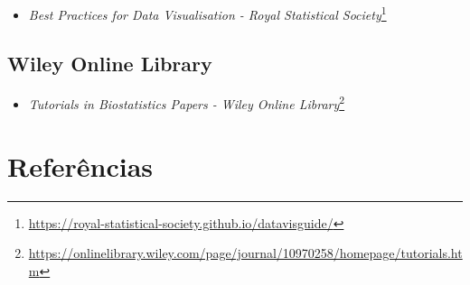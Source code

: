\documentclass[
  a4paper,
]{book}
\providecommand{\tightlist}{%
  \setlength{\itemsep}{0pt}\setlength{\parskip}{0pt}}
\renewcommand{\href}[2]{#2\footnote{\url{#1}}}
\newcommand{\DisableFootNotes}{%
  \renewcommand{\footnote}[2][]{\relax}
}
\begin{document}
\begin{itemize}
\tightlist
\item
  \href{https://royal-statistical-society.github.io/datavisguide/}{\emph{Best Practices for Data Visualisation - Royal Statistical Society}}
\end{itemize}

\hypertarget{wiley-online-library}{%
\section*{Wiley Online Library}\label{wiley-online-library}}

\begin{itemize}
\tightlist
\item
  \href{https://onlinelibrary.wiley.com/page/journal/10970258/homepage/tutorials.htm}{\emph{Tutorials in Biostatistics Papers - Wiley Online Library}}
\end{itemize}

\hypertarget{referuxeancias}{%
\chapter*{\texorpdfstring{\textbf{Referências}}{Referências}}\label{referuxeancias}}

\DisableFootNotes
\end{document}
